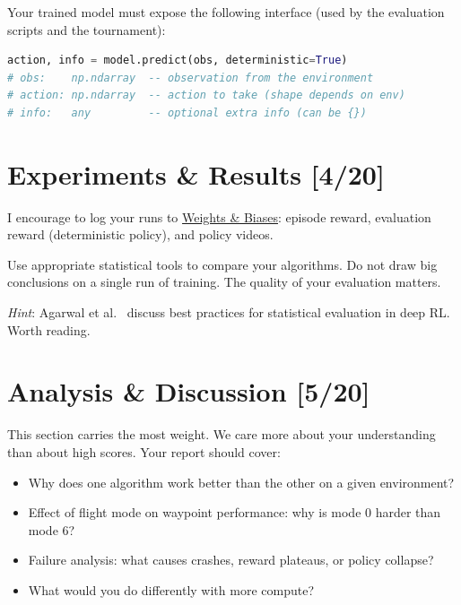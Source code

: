 \documentclass[11pt,a4paper]{article}
\newcommand{\pts}[1]{\hfill{\normalfont\normalsize\color{pts} [#1/20]}}
\begin{document}
Your trained model must expose the following interface (used by the evaluation scripts and the tournament):

\begin{lstlisting}[language=Python, numbers=none]
action, info = model.predict(obs, deterministic=True)
# obs:    np.ndarray  -- observation from the environment
# action: np.ndarray  -- action to take (shape depends on env)
# info:   any         -- optional extra info (can be {})
\end{lstlisting}

\section{Experiments \& Results\pts{4}}
\label{sec:protocol}

I encourage to log your runs to \href{https://wandb.ai}{Weights \& Biases}: episode reward, evaluation reward (deterministic policy), and policy videos.

Use appropriate statistical tools to compare your algorithms. Do not draw big conclusions on a single run of training. The quality of your evaluation matters.

\textit{Hint}: Agarwal et al.\ \cite{agarwal2021rliable} discuss best practices for statistical evaluation in deep RL. Worth reading.

\section{Analysis \& Discussion\pts{5}}
\label{sec:analysis}

This section carries the most weight. We care more about your understanding than about high scores. Your report should cover:

\begin{itemize}[nosep]
  \item Why does one algorithm work better than the other on a given environment?
  \item Effect of flight mode on waypoint performance: why is mode 0 harder than mode 6?
  \item Failure analysis: what causes crashes, reward plateaus, or policy collapse?
  \item What would you do differently with more compute?
\end{itemize}
\end{document}
